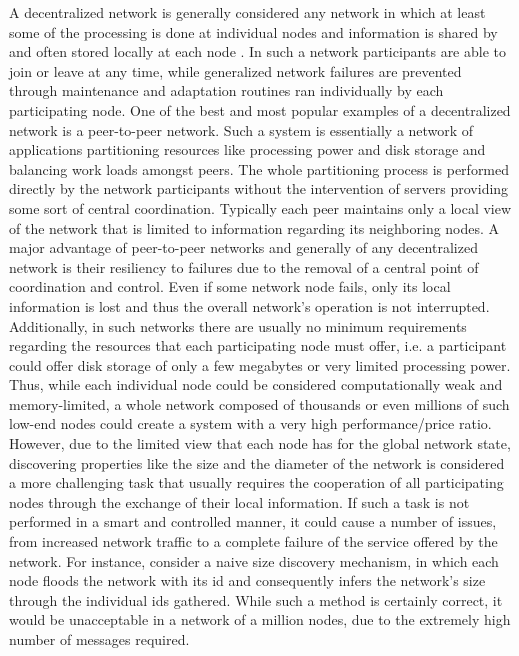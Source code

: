 \documentclass[a4paper,11pt,twoside]{report}
\begin{document}
A decentralized network is generally considered any network in which at least some of the processing is done at individual nodes and information is shared by and often stored locally at each node \cite{parker2003mcgraw}. In such a network participants are able to join or leave at any time, while generalized network failures are prevented through maintenance and adaptation routines ran individually by each participating node. One of the best and most popular examples of a decentralized network is a peer-to-peer network. Such a system is essentially a network of applications partitioning resources like processing power and disk storage and balancing work loads amongst peers. The whole partitioning process is performed directly by the network participants without the intervention of servers providing some sort of central coordination. Typically each peer maintains only a local view of the network that is limited to information regarding its neighboring nodes. A major advantage of peer-to-peer networks and generally of any decentralized network is their resiliency to failures due to the removal of a central point of coordination and control. Even if some network node fails, only its local information is lost and thus the overall network's operation is not interrupted. Additionally, in such networks there are usually no minimum requirements regarding the resources that each participating node must offer, i.e. a participant could offer disk storage of only a few megabytes or very limited processing power. Thus, while each individual node could be considered computationally weak and memory-limited, a whole network composed of thousands or even millions of such low-end nodes could create a system with a very high performance/price ratio. \\

However, due to the limited view that each node has for the global network state, discovering properties like the size and the diameter of the network is considered a more challenging task that usually requires the cooperation of all participating nodes through the exchange of their local information. If such a task is not performed in a smart and controlled manner, it could cause a number of issues, from increased network traffic to a complete failure of the service offered by the network. For instance, consider a naive size discovery mechanism, in which each node floods the network with its id and consequently infers the network's size through the individual ids gathered. While such a method is certainly correct, it would be unacceptable in a network of a million nodes, due to the extremely high number of messages required.\\
 
\end{document}
